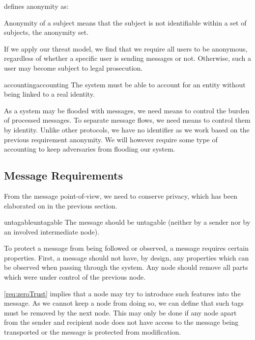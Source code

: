 \cite{anonTerminology} defines anonymity as:
\begin{shadequote}{}
	Anonymity of a subject means that the subject is not identifiable within a set of subjects, the anonymity set.
\end{shadequote}

If we apply our threat model, we find that we require all users to be anonymous, regardless of whether a specific user is sending messages or not. Otherwise, such a user may become subject to legal prosecution. 

\begin{requirement}{accounting}{accounting}
	The system must be able to account for an entity without being linked to a real identity.
\end{requirement}

As a system may be flooded with messages, we need means to control the burden of processed messages. To separate message flows, we need means to control them by identity. Unlike other protocols, we have no identifier as we work based on the previous requirement anonymity. We will however require some type of accounting to keep adversaries from flooding our system.

\subsection{Message Requirements}
From the message point-of-view, we need to conserve privacy, which has been elaborated on in the previous section.

\begin{requirement}{untagable}{untagable}
	The message should be untagable (neither by a sender nor by an involved intermediate node).
\end{requirement}

To protect a message from being followed or observed, a message requires certain properties. First, a message should not have, by design, any properties which can be observed when passing through the system. Any node should remove all parts which were under control of the previous node.

\ref{req:zeroTrust} implies that a node may try to introduce such features into the message. As we cannot keep a node from doing so, we can define that such tags must be removed by the next node. This may only be done if any node apart from the sender and recipient node does not have access to the message being transported or the message is protected from modification.

